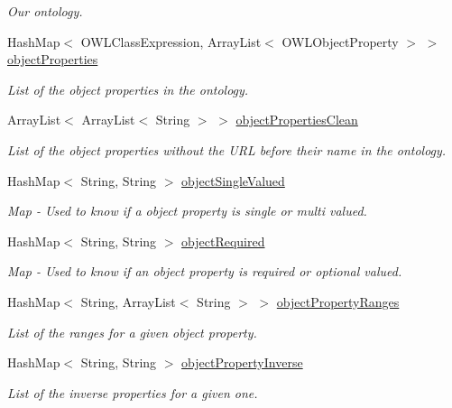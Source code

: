 \begin{DoxyCompactItemize}
\begin{DoxyCompactList}\small\item\em Our ontology. \end{DoxyCompactList}\item 
HashMap$<$ OWLClassExpression, ArrayList$<$ OWLObjectProperty $>$ $>$ \hyperlink{class_ontology_1_1_object_property_a887a6b686410445bba4c74fa0b650168}{objectProperties}
\begin{DoxyCompactList}\small\item\em List of the object properties in the ontology. \end{DoxyCompactList}\item 
ArrayList$<$ ArrayList$<$ String $>$ $>$ \hyperlink{class_ontology_1_1_object_property_afed9e7e803a7a9a541d1057936b2edaf}{objectPropertiesClean}
\begin{DoxyCompactList}\small\item\em List of the object properties without the URL before their name in the ontology. \end{DoxyCompactList}\item 
HashMap$<$ String, String $>$ \hyperlink{class_ontology_1_1_object_property_ae17f30505dd7960fa544de3063ccdb10}{objectSingleValued}
\begin{DoxyCompactList}\small\item\em Map -\/ Used to know if a object property is single or multi valued. \end{DoxyCompactList}\item 
HashMap$<$ String, String $>$ \hyperlink{class_ontology_1_1_object_property_a1bb591de60f79ef7fc2f194c93dcff92}{objectRequired}
\begin{DoxyCompactList}\small\item\em Map -\/ Used to know if an object property is required or optional valued. \end{DoxyCompactList}\item 
HashMap$<$ String, ArrayList$<$ String $>$ $>$ \hyperlink{class_ontology_1_1_object_property_a7e8b47c59b8d708d2ab5a02058a795f1}{objectPropertyRanges}
\begin{DoxyCompactList}\small\item\em List of the ranges for a given object property. \end{DoxyCompactList}\item 
HashMap$<$ String, String $>$ \hyperlink{class_ontology_1_1_object_property_a363cd9e611554fbad7c3efbc48621715}{objectPropertyInverse}
\begin{DoxyCompactList}\small\item\em List of the inverse properties for a given one. \end{DoxyCompactList}\end{DoxyCompactItemize}
